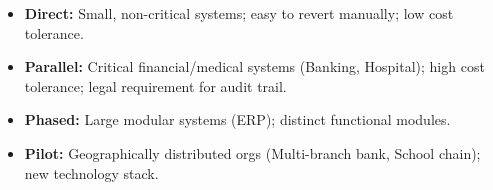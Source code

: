 \documentclass[11pt]{article}
\begin{document}
\begin{aretenir}
\begin{itemize}
    \item \textbf{Direct:} Small, non-critical systems; easy to revert manually; low cost tolerance.
    \item \textbf{Parallel:} Critical financial/medical systems (Banking, Hospital); high cost tolerance; legal requirement for audit trail.
    \item \textbf{Phased:} Large modular systems (ERP); distinct functional modules.
    \item \textbf{Pilot:} Geographically distributed orgs (Multi-branch bank, School chain); new technology stack.
\end{itemize}
\end{aretenir}
\end{document}
